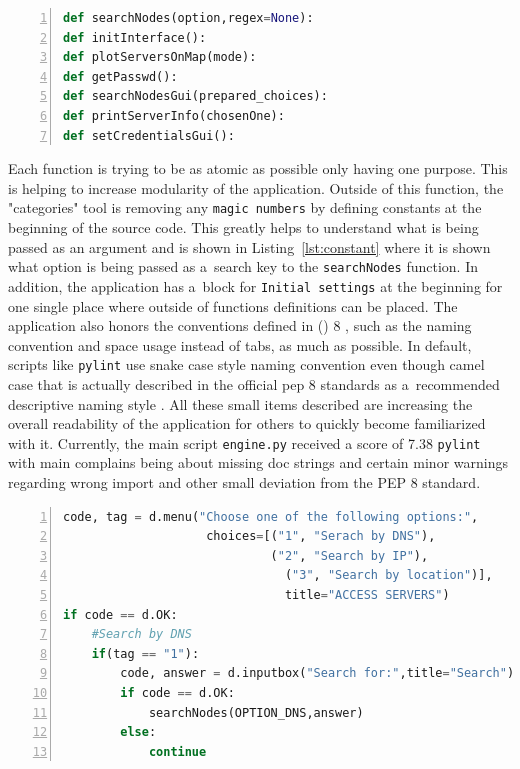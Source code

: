 {{{\noindent\begin{minipage}{\linewidth}
\begin{lstlisting}[language=Python, numbers=left, label={lst:descriptive}, caption=Example of Function Names, frame=single, showstringspaces=false, breaklines=true, keywordstyle=\color{blue},captionpos=b]
def searchNodes(option,regex=None):
def initInterface():
def plotServersOnMap(mode):
def getPasswd():
def searchNodesGui(prepared_choices):
def printServerInfo(chosenOne):
def setCredentialsGui():
\end{lstlisting}
\end{minipage}

Each function is trying to be as atomic as possible only having one purpose. This is helping to increase modularity of the application. Outside of this function, the "categories" tool is removing any \texttt{magic numbers} by defining constants at the beginning of the source code. This greatly helps to understand what is being passed as an argument and is shown in Listing~\ref{lst:constant} where it is shown what option is being passed as a~search key to the \texttt{searchNodes} function. In addition, the application has a~block for \texttt{Initial settings} at the beginning for one single place where outside of functions definitions can be placed. The application also honors the conventions defined in  () 8 \cite{pythonpep}, such as the naming convention and space usage instead of tabs, as much as possible. In default, scripts like \texttt{pylint} use snake case style naming convention even though camel case that is actually described in the official pep 8 standards as a~recommended descriptive naming style \cite{pythonpep}. All these small items described are increasing the overall readability of the application for others to quickly become familiarized with it. Currently, the main script \texttt{engine.py} received a score of 7.38 \texttt{pylint} with main complains being about missing doc strings and certain minor warnings regarding wrong import and other small deviation from the PEP 8 standard.

{\noindent\begin{minipage}{\linewidth}
\begin{lstlisting}[language=Python, numbers=left, label={lst:constant}, caption=Example of Constant Usage, frame=single, showstringspaces=false, breaklines=true, keywordstyle=\color{blue},captionpos=b]
code, tag = d.menu("Choose one of the following options:",
					choices=[("1", "Serach by DNS"),
				      		 ("2", "Search by IP"),
					    	   ("3", "Search by location")],
						       title="ACCESS SERVERS")
if code == d.OK:
	#Search by DNS
	if(tag == "1"):
		code, answer = d.inputbox("Search for:",title="Search")
		if code == d.OK:
			searchNodes(OPTION_DNS,answer)
		else:
			continue
\end{lstlisting}
\end{minipage}

}}}}
